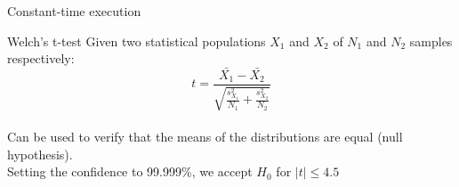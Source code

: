 
\begin{frame}{Constant-time execution}
    \begin{block}{Welch's t-test}
        Given two statistical populations $X_1$ and $X_2$ of $N_1$ and $N_2$ samples respectively:
        \begin{equation*}
            t = \frac{\bar{X_1} - \bar{X_2}}{\sqrt{\frac{s_{X_1}^2}{N_1} + \frac{s_{X_2}^2}{N_2}}}
        \end{equation*}\\
    Can be used to verify that the means of the distributions are equal (null hypothesis).\\
    Setting the confidence to 99.999\%, we accept $H_0$ for $|t| \leq 4.5$
    \end{block}
\end{frame}

